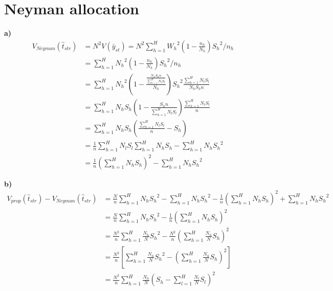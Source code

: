 \documentclass[11pt]{article}
\begin{document}
\section{Neyman allocation}
\textbf{a)}
\begin{align*} 
V_{Neyman}(\hat{t}_{str}) & = N^2V(\bar{y}_{st}) = N^2\sum_{h=1}^{H}{{W_h}^2(1-\frac{n_h}{N_h}){S_h}^2/n_h} \\ 
& = \sum_{h=1}^{H}{{N_h}^2(1-\frac{n_h}{N_h}){S_h}^2/n_h} \\
& = \sum_{h=1}^{H}{{N_h}^2(1-\frac{\frac{N_hS_hn}{\sum_{h=1}^{H}{N_lS_l}}}{N_h}){S_h}^2\frac{\sum_{h=1}^{H}{N_lS_l}}{N_hS_hn}}\\
& = \sum_{h=1}^{H}{N_hS_h(1-\frac{S_hn}{\sum_{h=1}^{H}{N_lS_l}})\frac{\sum_{h=1}^{H}{N_lS_l}}{n}}\\
& = \sum_{h=1}^{H}{N_hS_h(\frac{\sum_{h=1}^{H}{N_lS_l}}{n}-S_h)}\\
& = \frac{1}{n}\sum_{h=1}^{H}{N_lS_l}\sum_{h=1}^{H}{N_hS_h} - \sum_{h=1}^{H}{N_h{S_h}^2}\\
& = \frac{1}{n}(\sum_{h=1}^{H}{N_hS_h})^2 - \sum_{h=1}^{H}{N_h{S_h}^2}
\end{align*}

\textbf{b)}
\begin{align*} 
V_{prop}(\hat{t}_{str})  - V_{Neyman}(\hat{t}_{str}) & =  \frac{N}{n}\sum_{h=1}^{H}{N_h{S_h}^2} -  \sum_{h=1}^{H}{N_h{S_h}^2} -  \frac{1}{n}(\sum_{h=1}^{H}{N_hS_h})^2 + \sum_{h=1}^{H}{N_h{S_h}^2}\\
& =  \frac{N}{n}\sum_{h=1}^{H}{N_h{S_h}^2} -  \frac{1}{n}(\sum_{h=1}^{H}{N_hS_h})^2\\
& =  \frac{N^2}{n}\sum_{h=1}^{H}{\frac{N_h}{N}{S_h}^2} - \frac{N^2}{n}(\sum_{h=1}^{H}{\frac{N_h}{N}S_h})^2\\
& =  \frac{N^2}{n}[\sum_{h=1}^{H}{\frac{N_h}{N}{S_h}^2} - (\sum_{h=1}^{H}{\frac{N_h}{N}S_h})^2]\\
& =  \frac{N^2}{n}\sum_{h=1}^{H}{\frac{N_h}{N}(S_h-\sum_{l=1}^{H}{\frac{N_l}{N}S_l})^2}
\end{align*}
\end{document}
